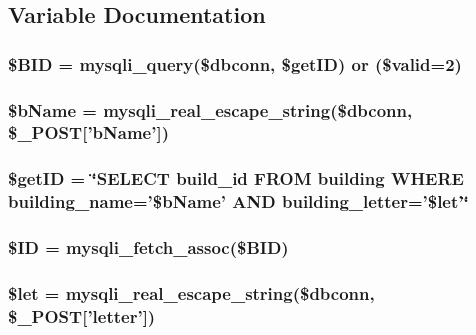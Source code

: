 \subsection{\-Variable \-Documentation}
\hypertarget{edBuilding_8php_a7458cf5c1cfaeb93fe055362ecff999e}{
\subsubsection[{\$\-B\-I\-D}]{\setlength{\rightskip}{0pt plus 5cm}\$\-B\-I\-D = mysqli\-\_\-query(\$dbconn, \$get\-I\-D) or (\$valid=2)}}\label{edBuilding_8php_a7458cf5c1cfaeb93fe055362ecff999e}
\hypertarget{edBuilding_8php_adda32c78f7f7aed9a0f7bb03a9198e9c}{
\subsubsection[{\$b\-Name}]{\setlength{\rightskip}{0pt plus 5cm}\$b\-Name = mysqli\-\_\-real\-\_\-escape\-\_\-string(\$dbconn, \$\-\_\-\-P\-O\-S\-T\mbox{[}'b\-Name'\mbox{]})}}\label{edBuilding_8php_adda32c78f7f7aed9a0f7bb03a9198e9c}
\hypertarget{edBuilding_8php_aae30003a4d3fab7dc75a19cbfddea7a8}{
\subsubsection[{\$get\-I\-D}]{\setlength{\rightskip}{0pt plus 5cm}\$get\-I\-D = \char`\"{}\-S\-E\-L\-E\-C\-T build\-\_\-id \-F\-R\-O\-M building \-W\-H\-E\-R\-E building\-\_\-name='\$b\-Name' \-A\-N\-D building\-\_\-letter='\$let'\char`\"{}}}\label{edBuilding_8php_aae30003a4d3fab7dc75a19cbfddea7a8}
\hypertarget{edBuilding_8php_a68d2e459193313b71494801a69ade623}{
\subsubsection[{\$\-I\-D}]{\setlength{\rightskip}{0pt plus 5cm}\$\-I\-D = mysqli\-\_\-fetch\-\_\-assoc(\$\-B\-I\-D)}}\label{edBuilding_8php_a68d2e459193313b71494801a69ade623}
\hypertarget{edBuilding_8php_ac3687b5a21519c53f240b5d1c07f997a}{
\subsubsection[{\$let}]{\setlength{\rightskip}{0pt plus 5cm}\$let = mysqli\-\_\-real\-\_\-escape\-\_\-string(\$dbconn, \$\-\_\-\-P\-O\-S\-T\mbox{[}'letter'\mbox{]})}}\label{edBuilding_8php_ac3687b5a21519c53f240b5d1c07f997a}
